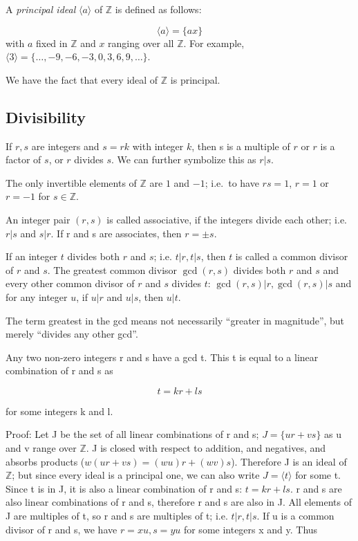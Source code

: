 
A \emph{principal ideal} \(\langle a \rangle\) of \(\mathbb{Z}\) is
defined as follows:

\[
\langle a \rangle = \{ax\}
\] with \(a\) fixed in \(\mathbb{Z}\) and \(x\) ranging over all
\(\mathbb{Z}\). For example,
\(\langle 3 \rangle = \{\ldots, -9, -6, -3, 0, 3, 6, 9, \ldots\}\).

We have the fact that every ideal of \(\mathbb{Z}\) is principal.

\subsection{Divisibility}\label{divisibility}

If \(r, s\) are integers and \(s = rk\) with integer \(k\), then s is a
multiple of \(r\) or \(r\) is a factor of \(s\), or \(r\) divides \(s\).
We can further symbolize this as \(r | s\).

The only invertible elements of \(\mathbb{Z}\) are \(1\) and \(-1\);
i.e.~to have \(rs=1\), \(r=1\) or \(r=-1\) for \(s \in \mathbb{Z}\).

An integer pair \((r,s)\) is called associative, if the integers divide
each other; i.e. \(r|s\) and \(s|r\). If r and s are associates, then
\(r = \pm s\).

If an integer \(t\) divides both \(r\) and \(s\); i.e. \(t|r, t|s\),
then \(t\) is called a common divisor of \(r\) and \(s\). The greatest
common divisor \(\gcd(r,s)\) divides both \(r\) and \(s\) and every
other common divisor of \(r\) and \(s\) divides \(t\):
\(\gcd(r,s) | r, \gcd(r,s) | s\) and for any integer \(u\), if \(u|r\)
and \(u|s\), then \(u|t\).

The term greatest in the gcd means not necessarily ``greater in
magnitude'', but merely ``divides any other gcd''.

Any two non-zero integers r and s have a gcd t. This t is equal to a
linear combination of r and s as

\[
t = kr + ls
\]

for some integers k and l.

Proof: Let J be the set of all linear combinations of r and s;
\(J=\{ur+vs\}\) as u and v range over \(\mathbb{Z}\). J is closed with
respect to addition, and negatives, and absorbs products
(\(w(ur+vs) = (wu)r + (wv)s\)). Therefore J is an ideal of
\(\mathbb{Z}\); but since every ideal is a principal one, we can also
write \(J=\langle t \rangle\) for some t. Since t is in J, it is also a
linear combination of r and s: \(t = kr + ls\). r and s are also linear
combinations of r and s, therefore r and s are also in J. All elements
of J are multiples of t, so r and s are multiples of t; i.e.
\(t|r, t|s\). If u is a common divisor of r and s, we have
\(r=xu, s=yu\) for some integers x and y. Thus

